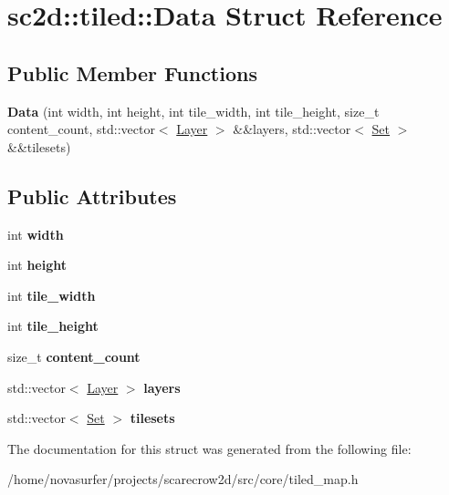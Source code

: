 \hypertarget{structsc2d_1_1tiled_1_1Data}{}\section{sc2d\+:\+:tiled\+:\+:Data Struct Reference}
\label{structsc2d_1_1tiled_1_1Data}
\subsection*{Public Member Functions}
\begin{DoxyCompactItemize}
\item 
\mbox{\label{structsc2d_1_1tiled_1_1Data_afe701cb3bf7fca0d60dcb79d73aa1fc8}} 
{\bfseries Data} (int width, int height, int tile\+\_\+width, int tile\+\_\+height, size\+\_\+t content\+\_\+count, std\+::vector$<$ \hyperlink{classsc2d_1_1tiled_1_1Layer}{Layer} $>$ \&\&layers, std\+::vector$<$ \hyperlink{classsc2d_1_1tiled_1_1Set}{Set} $>$ \&\&tilesets)
\end{DoxyCompactItemize}
\subsection*{Public Attributes}
\begin{DoxyCompactItemize}
\item 
\mbox{\label{structsc2d_1_1tiled_1_1Data_a3f86f88b80495e891963593a06b528de}} 
int {\bfseries width}
\item 
\mbox{\label{structsc2d_1_1tiled_1_1Data_ab25eb1991440e32b15ac4b86e742046c}} 
int {\bfseries height}
\item 
\mbox{\label{structsc2d_1_1tiled_1_1Data_aac07fb74219d04a2255eb4d9e5c51ec2}} 
int {\bfseries tile\+\_\+width}
\item 
\mbox{\label{structsc2d_1_1tiled_1_1Data_a399ec47b2b3691a5007b158569d70455}} 
int {\bfseries tile\+\_\+height}
\item 
\mbox{\label{structsc2d_1_1tiled_1_1Data_a7824e7c4d1aee3170519687db7197a7e}} 
size\+\_\+t {\bfseries content\+\_\+count}
\item 
\mbox{\label{structsc2d_1_1tiled_1_1Data_a0ca0ab74fb9ac2338c621269dacfef1a}} 
std\+::vector$<$ \hyperlink{classsc2d_1_1tiled_1_1Layer}{Layer} $>$ {\bfseries layers}
\item 
\mbox{\label{structsc2d_1_1tiled_1_1Data_aa778e89744ce4d82feb2c2dc085705d9}} 
std\+::vector$<$ \hyperlink{classsc2d_1_1tiled_1_1Set}{Set} $>$ {\bfseries tilesets}
\end{DoxyCompactItemize}


The documentation for this struct was generated from the following file\+:\begin{DoxyCompactItemize}
\item 
/home/novasurfer/projects/scarecrow2d/src/core/tiled\+\_\+map.\+h\end{DoxyCompactItemize}

